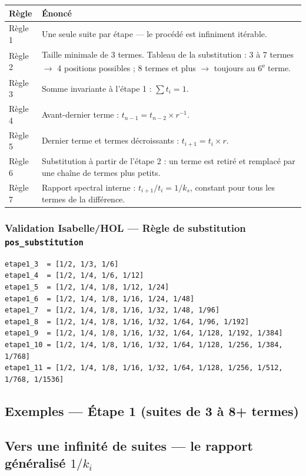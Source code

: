 \documentclass[11pt,a4paper]{article}
\begin{document}
\begin{longtable}{p{2.2cm}p{11cm}}
\toprule
\textbf{Règle} & \textbf{Énoncé} \\
\midrule
\endhead
Règle 1 & Une seule suite par étape --- le procédé est infiniment itérable. \\
Règle 2 & Taille minimale de 3 termes. Tableau de la substitution : 3 à 7 termes $\to$ 4 positions possibles ; 8 termes et plus $\to$ toujours au 6\textsuperscript{e} terme. \\
Règle 3 & Somme invariante à l'étape 1 : $\sum t_i = 1$. \\
Règle 4 & Avant-dernier terme : $t_{n-1} = t_{n-2} \times r^{-1}$. \\
Règle 5 & Dernier terme et termes décroissants : $t_{i+1} = t_i \times r$. \\
Règle 6 & Substitution à partir de l'étape 2 : un terme est retiré et remplacé par une chaîne de termes plus petits. \\
Règle 7 & Rapport spectral interne : $t_{i+1}/t_i = 1/k_s$, constant pour tous les termes de la différence. \\
\bottomrule
\end{longtable}

\subsubsection*{Validation Isabelle/HOL --- Règle de substitution \texttt{pos\_substitution}}

\begin{verbatim}
etape1_3  = [1/2, 1/3, 1/6]
etape1_4  = [1/2, 1/4, 1/6, 1/12]
etape1_5  = [1/2, 1/4, 1/8, 1/12, 1/24]
etape1_6  = [1/2, 1/4, 1/8, 1/16, 1/24, 1/48]
etape1_7  = [1/2, 1/4, 1/8, 1/16, 1/32, 1/48, 1/96]
etape1_8  = [1/2, 1/4, 1/8, 1/16, 1/32, 1/64, 1/96, 1/192]
etape1_9  = [1/2, 1/4, 1/8, 1/16, 1/32, 1/64, 1/128, 1/192, 1/384]
etape1_10 = [1/2, 1/4, 1/8, 1/16, 1/32, 1/64, 1/128, 1/256, 1/384, 1/768]
etape1_11 = [1/2, 1/4, 1/8, 1/16, 1/32, 1/64, 1/128, 1/256, 1/512, 1/768, 1/1536]
\end{verbatim}

\subsection{Exemples --- Étape 1 (suites de 3 à 8+ termes)}
\subsection{Vers une infinité de suites --- le rapport généralisé $1/k_i$}
\end{document}
